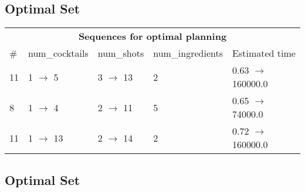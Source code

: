 \documentclass{article}
\begin{document}
                            \subsection*{Optimal Set}

                            \begin{center}
                            \begin{tabular}{@{}l|l|l|l|l@{}}
                            \multicolumn{5}{c}{\bf \large Sequences for optimal planning}\\
                            \# & num\_cocktails & num\_shots & num\_ingredients & Estimated time\\\midrule
                            11&1 $\rightarrow$ 5&3 $\rightarrow$ 13&2&0.63 $\rightarrow$ 160000.0\\
8&1 $\rightarrow$ 4&2 $\rightarrow$ 11&5&0.65 $\rightarrow$ 74000.0\\
11&1 $\rightarrow$ 13&2 $\rightarrow$ 14&2&0.72 $\rightarrow$ 160000.0
                            \end{tabular}
                            \end{center}
                    
                                \subsection*{Optimal Set}
                                
\end{document}
